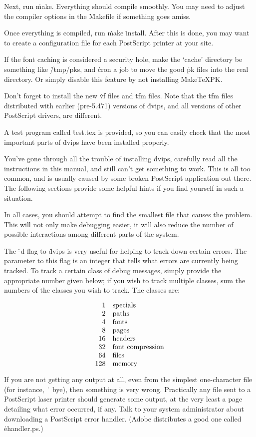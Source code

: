 Next, run \.{make}.  Everything should compile smoothly.  You may need
to adjust the compiler options in the \.{Makefile} if something goes
amiss.

Once everything is compiled, run \.{make} \.{install}.  After this is done,
you may want to create a configuration file for each PostScript printer
at your site.

If the font caching is considered a security hole, make the `cache'
directory be something like \.{/tmp/pks}, and \.{cron} a job to move the
good \.{pk} files into the real directory.  Or simply disable this
feature by not installing \.{MakeTeXPK}.

Don't forget to install the new \.{vf} files and \.{tfm} files.  Note
that the \.{tfm} files distributed with earlier (pre-5.471) versions
of \.{dvips}, and all versions of other PostScript drivers, are different.

A test program called \.{test.tex} is provided, so you can easily check
that the most important parts of \.{dvips} have been installed properly.


You've gone through all the trouble of installing \.{dvips}, carefully
read all the instructions in this manual, and still can't get something
to work.  This is all too common, and is usually caused by some broken
PostScript application out there.  The following sections provide some
helpful hints if you find yourself in such a situation.

In all cases, you should attempt to find the smallest file that causes
the problem.  This will not only make debugging easier, it will also
reduce the number of possible interactions among different parts of the
system.


The \.{-d} flag to \.{dvips} is very useful for helping to track down
certain errors.  The parameter to this flag is an integer that tells
what errors are currently being tracked.  To track a certain class of
debug messages, simply provide the appropriate number given below;
if you wish to track multiple classes, sum the numbers of the classes
you wish to track.  The classes are:

$$\vbox{\halign{\hfil #\quad&#\hfil\cr
1&specials\cr2&paths\cr4&fonts\cr8&pages\cr16&headers\cr
32&font compression\cr64&files\cr
128&memory\cr}}$$


If you are not getting any output at all, even from the simplest
one-character file (for instance, \.{~ bye}),
then something is very wrong.  Practically any file sent to a
PostScript laser printer should generate some output, at the very
least a page detailing what error occurred, if any.  Talk to your
system administrator about downloading a PostScript error handler.
(Adobe distributes a good one called \.{ehandler.ps}.)

